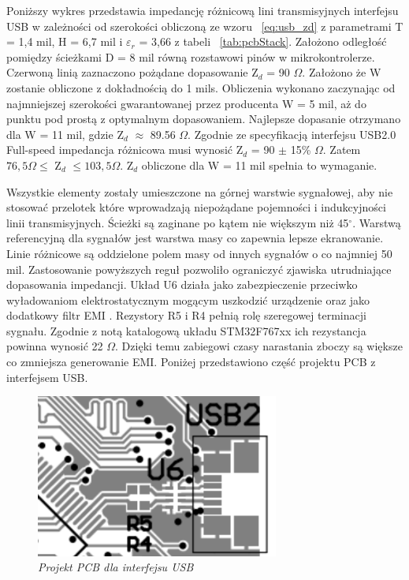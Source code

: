 \documentclass[eng,printmode]{mgr}
\begin{document}
Poniższy wykres przedstawia impedancję różnicową lini transmisyjnych interfejsu USB w zależności od szerokości obliczoną ze wzoru ~\ref{eq:usb_zd} z parametrami T = 1,4 mil, H = 6,7 mil i \textbf{$\varepsilon_r$} = 3,66 z tabeli ~\ref{tab:pcbStack}. Założono odległość pomiędzy ścieżkami D = 8 mil równą rozstawowi pinów w mikrokontrolerze. Czerwoną linią zaznaczono pożądane dopasowanie Z$_d$ = 90 $\Omega$. Założono że W zostanie obliczone z dokładnością do 1 mils. Obliczenia wykonano zaczynając od najmniejszej szerokości gwarantowanej przez producenta W = 5 mil, aż do punktu pod prostą z optymalnym dopasowaniem. Najlepsze dopasanie otrzymano dla W = 11 mil, gdzie Z$_d$ $\approx$ 89.56 $\Omega$. Zgodnie ze specyfikacją interfejsu USB2.0 Full-speed impedancja różnicowa musi wynosić Z$_d$ = 90 $\pm$ 15\% $\Omega$. Zatem $ 76,5\Omega \leq$ Z$_d$ $\leq 103,5\Omega$. Z$_d$ obliczone dla W = 11 mil spełnia to wymaganie.

Wszystkie elementy zostały umieszczone na górnej warstwie sygnałowej, aby nie stosować przelotek które wprowadzają niepożądane pojemności i indukcyjności linii transmisyjnych. Ścieżki są zaginane po kątem nie większym niż 45$^\circ$. Warstwą referencyjną dla sygnałów jest warstwa masy co zapewnia lepsze ekranowanie. Linie różnicowe są oddzielone polem masy od innych sygnałów o co najmniej 50 mil. Zastosowanie powyższych reguł pozwoliło ograniczyć zjawiska utrudniające dopasowania impedancji. Układ U6 działa jako zabezpieczenie przeciwko wyładowaniom elektrostatycznym mogącym uszkodzić urządzenie oraz jako dodatkowy filtr EMI . Rezystory R5 i R4 pełnią rolę szeregowej terminacji sygnału. Zgodnie z notą katalogową układu STM32F767xx ich rezystancja powinna wynosić 22 \textbf{$\Omega$}. Dzięki temu zabiegowi czasy narastania zboczy są większe co zmniejsza generowanie EMI. Poniżej przedstawiono część projektu PCB z interfejsem USB.

\begin{figure}[!h]
    \centering
    \includegraphics[width=8cm]{pcb/usb.png}
    \caption{\textit{Projekt PCB dla interfejsu USB}}
\end{figure}
\end{document}
